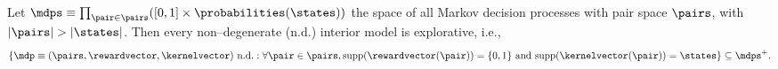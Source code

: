 \documentclass[preprint,cleveref,12pt]{colt2025}
\DeclarePairedDelimiter{\braces}{\{}{\}}	%
\DeclarePairedDelimiter{\abs}{\lvert}{\rvert}	%
\def\product{\prod}
\def\model{\mdp}
\def\models{\mdps}
\def\kernel{\kernelvector}
\def\reward{\rewardvector}
\begin{document}
    \begin{proposition}
    \label{proposition_interior_models_are_explorative}
        Let $\models \equiv \product_{\pair \in \pairs} ([0, 1] \times \probabilities(\states))$ the space of all Markov decision processes with pair space $\pairs$, with $\abs{\pairs} > \abs{\states}$.
        Then every non--degenerate (n.d.) interior model is explorative, i.e., 
        \begin{equation*}
            \braces*{
                \model \equiv (\pairs, \reward, \kernel)
                \text{~n.d.}
                :
                \forall \pair \in \pairs,
                \mathrm{supp}(\reward(\pair)) = \braces{0, 1}
                \text{~and~}
                \mathrm{supp}(\kernel(\pair)) = \states
            }
            \subseteq 
            \models^+
            .
        \end{equation*}
    \end{proposition}
\end{document}
